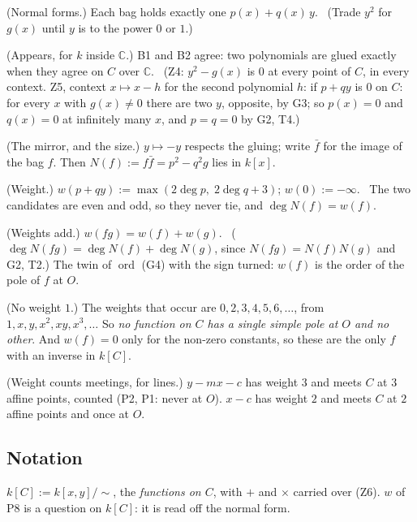 \begin{lines}
\item[\lab{P5}] (Normal forms.) Each bag holds exactly one $p(x) + q(x)\,y$. \ (Trade $y^2$ for $g(x)$ until $y$ is to the power $0$ or $1$.)
\item[\lab{P6}] (Appears, for $k$ inside $\mathbb{C}$.) B1 and B2 agree: two polynomials are glued exactly when they agree on $C$ over $\mathbb{C}$. \ (Z4: $y^2 - g(x)$ is $0$ at every point of $C$, in every context. Z5, context $x \mapsto x - h$ for the second polynomial $h$: if $p + qy$ is $0$ on $C$: for every $x$ with $g(x) \ne 0$ there are two $y$, opposite, by G3; so $p(x) = 0$ and $q(x) = 0$ at infinitely many $x$, and $p = q = 0$ by G2, T4.)
\item[\lab{P7}] (The mirror, and the size.) $y \mapsto -y$ respects the gluing; write $\bar f$ for the image of the bag $f$. Then $N(f) := f \bar f = p^2 - q^2 g$ lies in $k[x]$.
\item[\lab{P8}] (Weight.) $w(p + qy) := \max(2 \deg p,\; 2 \deg q + 3)$; $w(0) := -\infty$. \ The two candidates are even and odd, so they never tie, and $\deg N(f) = w(f)$.
\item[\lab{P9}] (Weights add.) $w(fg) = w(f) + w(g)$. \ ($\deg N(fg) = \deg N(f) + \deg N(g)$, since $N(fg) = N(f) N(g)$ and G2, T2.) The twin of $\operatorname{ord}$ (G4) with the sign turned: $w(f)$ is the order of the pole of $f$ at $O$.
\item[\lab{P10}] (No weight $1$.) The weights that occur are $0, 2, 3, 4, 5, 6, \dots$, from $1, x, y, x^2, xy, x^3, \dots$ So \emph{no function on $C$ has a single simple pole at $O$ and no other}. And $w(f) = 0$ only for the non-zero constants, so these are the only $f$ with an inverse in $k[C]$.
\item[\lab{P11}] (Weight counts meetings, for lines.) $y - mx - c$ has weight $3$ and meets $C$ at $3$ affine points, counted (P2, P1: never at $O$). $x - c$ has weight $2$ and meets $C$ at $2$ affine points and once at $O$.
\end{lines}

\subsection*{Notation}

\begin{lines}
\item[\lab{N1}] $k[C] := k[x, y]/{\sim}$, the \emph{functions on $C$}, with $+$ and $\times$ carried over (Z6). $w$ of P8 is a question on $k[C]$: it is read off the normal form.
\end{lines}

